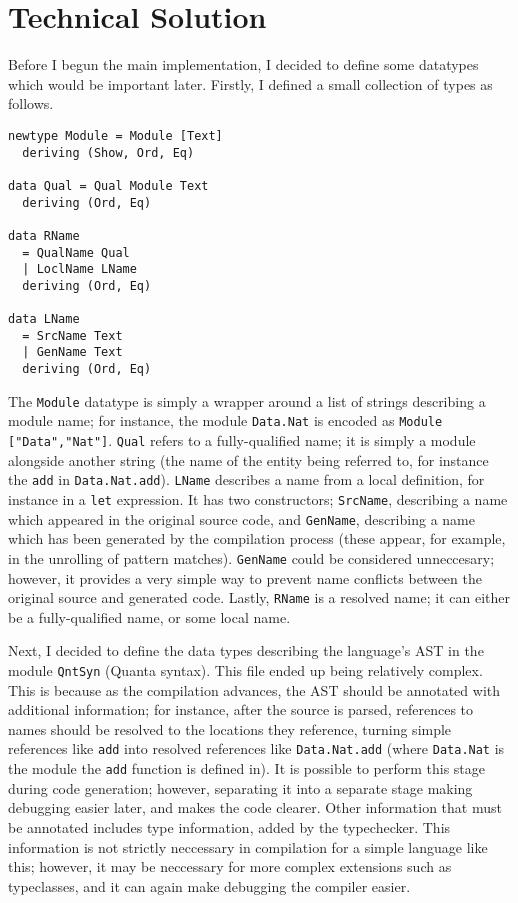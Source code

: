 \documentclass[9pt]{extarticle}
\begin{document}
\section{Technical Solution}

Before I begun the main implementation, I decided to define some
datatypes which would be important later. Firstly, I defined a small
collection of types as follows.

\begin{verbatim}
newtype Module = Module [Text]
  deriving (Show, Ord, Eq)

data Qual = Qual Module Text
  deriving (Ord, Eq)

data RName
  = QualName Qual
  | LoclName LName
  deriving (Ord, Eq)

data LName
  = SrcName Text
  | GenName Text
  deriving (Ord, Eq)
\end{verbatim}

The \verb'Module' datatype is simply a wrapper around a list of strings
describing a module name; for instance, the module \verb'Data.Nat' is
encoded as \verb'Module ["Data","Nat"]'. \verb'Qual' refers to a
fully-qualified name; it is simply a module alongside another string
(the name of the entity being referred to, for instance the \verb'add'
in \verb'Data.Nat.add'). \verb'LName' describes a name from a local
definition, for instance in a \verb'let' expression. It has two
constructors; \verb'SrcName', describing a name which appeared in the
original source code, and \verb'GenName', describing a name which has
been generated by the compilation process (these appear, for example, in
the unrolling of pattern matches). \verb'GenName' could be considered
unneccesary; however, it provides a very simple way to prevent name
conflicts between the original source and generated code. Lastly,
\verb'RName' is a resolved name; it can either be a fully-qualified
name, or some local name.

Next, I decided to define the data types describing the language's AST
in the module \verb'QntSyn' (Quanta syntax). This file ended up being
relatively complex. This is because as the compilation advances, the AST
should be annotated with additional information; for instance, after the
source is parsed, references to names should be resolved to the
locations they reference, turning simple references like \verb'add' into
resolved references like \verb'Data.Nat.add' (where \verb'Data.Nat' is
the module the \verb'add' function is defined in). It is possible to
perform this stage during code generation; however, separating it into a
separate stage making debugging easier later, and makes the code
clearer. Other information that must be annotated includes type
information, added by the typechecker. This information is not strictly
neccessary in compilation for a simple language like this; however, it
may be neccessary for more complex extensions such as typeclasses, and
it can again make debugging the compiler easier.
\end{document}
